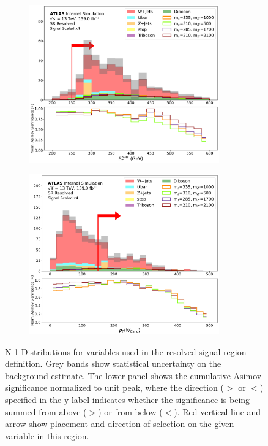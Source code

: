\begin{figure}[htbp]
\begin{subfigure}[t]{0.48\textwidth}
     \includegraphics[width = 0.9\textwidth]{Figures/5/SR1L_Resolved/MetTST_met_normSig_N_1.pdf}
    \caption{\met}
    \end{subfigure}
    \begin{subfigure}[t]{0.48\textwidth}
    \centering
     \includegraphics[width = 0.9\textwidth]{Figures/5/SR1L_Resolved/WCand_pt_normSig_N_1.pdf}
    \caption{\Wcandpt}
    \end{subfigure}
     \caption{N-1 Distributions for variables used in the resolved signal region definition. Grey bands show statistical uncertainty on the background estimate. The lower panel shows the cumulative Asimov significance normalized to unit peak, where the direction (\(>\) or \(<\)) specified in the y label indicates whether the significance is being summed from above (\(>\)) or from below (\(<\)). Red vertical line and arrow show placement and direction of selection on the given variable in this region.}
     \label{fig:Nminus1resolvedSR_app}
\end{figure}